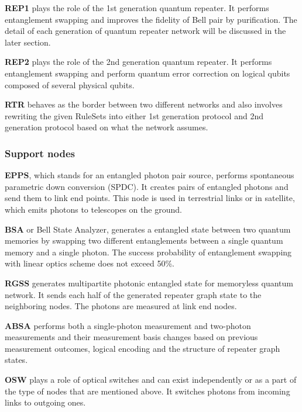 \textbf{REP1} plays the role of the 1st generation quantum repeater. It performs entanglement swapping and improves the fidelity of Bell pair by purification.
The detail of each generation of quantum repeater network will be discussed in the later section.

\textbf{REP2} plays the role of the 2nd generation quantum repeater. It performs entanglement swapping and perform quantum error correction on logical qubits composed of several physical qubits.

\textbf{RTR} behaves as the border between two different networks and also involves rewriting the given RuleSets into either 1st generation protocol and 2nd generation protocol based on what the network assumes.

\subsubsection{Support nodes}

\textbf{EPPS}, which stands for an entangled photon pair source, performs spontaneous parametric down conversion (SPDC).
It creates pairs of entangled photons and send them to link end points. This node is used in terrestrial links or in satellite, which emits photons to telescopes on the ground.

\textbf{BSA} or Bell State Analyzer, generates a entangled state between two quantum memories by swapping two different entanglements between a single quantum memory and a single photon.
The success probability of entanglement swapping with linear optics scheme does not exceed 50\%.

\textbf{RGSS} generates multipartite photonic entangled state for memoryless quantum network. It sends each half of the generated repeater graph state to the neighboring nodes.
The photons are measured at link end nodes.

\textbf{ABSA} performs both a single-photon measurement and two-photon measurements and their measurement basis changes based on previous measurement outcomes, logical encoding and the structure of repeater graph states.

\textbf{OSW} plays a role of optical switches and can exist independently or as a part of the type of nodes that are mentioned above.
It switches photons from incoming links to outgoing ones.

